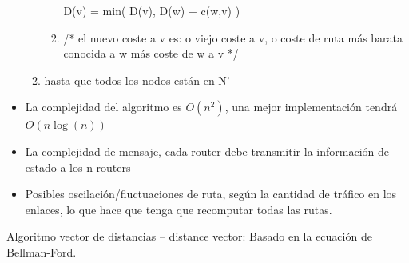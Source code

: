 \documentclass[12pt, twoside, openright]{report} %
\begin{document}
\begin{itemize}
\begin{enumerate}
\begin{enumerate}
			                  D(v) = min( D(v), D(w) + c(w,v) )

			            \item /* el nuevo coste a v es: o viejo coste a v, o coste de ruta más barata conocida a w más coste de w a v */
		            \end{enumerate}
		      \item hasta que todos los nodos están en N'
	      \end{enumerate}

	\item La complejidad del algoritmo es \(O(n^2)\), una mejor
	      implementación tendrá \(O(n \log (n))\)
	\item La complejidad de mensaje, cada router debe transmitir la
	      información de estado a los n routers
	\item Posibles oscilación/fluctuaciones de ruta, según la cantidad de
	      tráfico en los enlaces, lo que hace que tenga que recomputar todas
	      las rutas.

\end{itemize}

Algoritmo vector de distancias -- distance vector: Basado en la
ecuación de Bellman-Ford.
\end{document}
